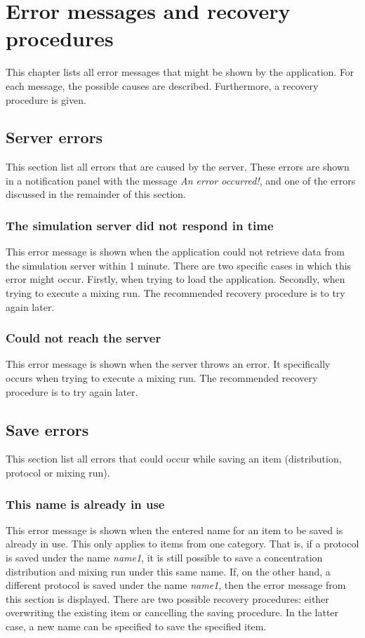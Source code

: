 \chapter{Error messages and recovery procedures}
This chapter lists all error messages that might be shown by the application. For each message, the possible causes are described. Furthermore, a recovery procedure is given.

\section {Server errors}
This section list all errors that are caused by the server. These errors are shown in a notification panel with the message \emph{An error occurred!}, and one of the errors discussed in the remainder of this section.

\subsection{The simulation server did not respond in time}
This error message is shown when the application could not retrieve data from the simulation server within 1 minute. There are two specific cases in which this error might occur. Firstly, when trying to load the application. Secondly, when trying to execute a mixing run. The recommended recovery procedure is to try again later.

\subsection{Could not reach the server}
This error message is shown when the server throws an error. It specifically occurs when trying to execute a mixing run. The recommended recovery procedure is to try again later.

\section{Save errors}
This section list all errors that could occur while saving an item (distribution, protocol or mixing run).

\subsection{This name is already in use}
This error message is shown when the entered name for an item to be saved is already in use. This only applies to items from one category. That is, if a protocol is saved under the name \emph{name1}, it is still possible to save a concentration distribution and mixing run under this same name. If, on the other hand, a different protocol is saved under the name \emph{name1}, then the error message from this section is displayed. There are two possible recovery procedures: either overwriting the existing item or cancelling the saving procedure. In the latter case, a new name can be specified to save the specified item.

